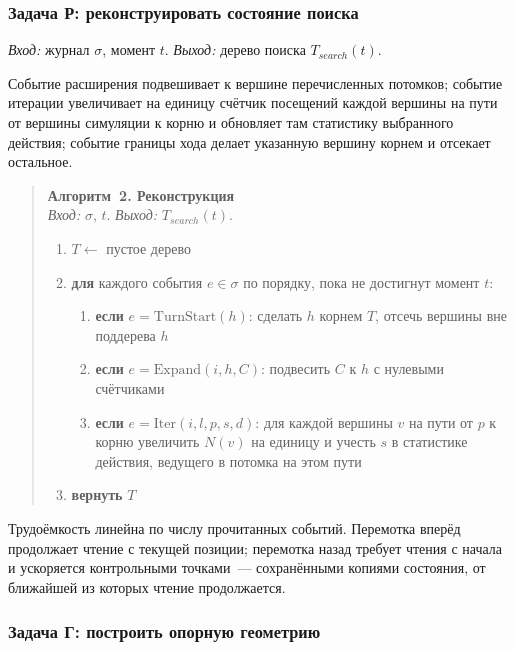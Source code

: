 \subsubsection{Задача Р: реконструировать состояние поиска}

\emph{Вход:} журнал $\sigma$, момент $t$.
\emph{Выход:} дерево поиска $T_{search}(t)$.

Событие расширения подвешивает к вершине перечисленных потомков; событие
итерации увеличивает на единицу счётчик посещений каждой вершины на пути от
вершины симуляции к корню и обновляет там статистику выбранного действия;
событие границы хода делает указанную вершину корнем и отсекает остальное.

\begin{quote}
\textbf{Алгоритм~2. Реконструкция}\\
\emph{Вход:} $\sigma$, $t$. \emph{Выход:} $T_{search}(t)$.
\begin{enumerate}
  \item $T \leftarrow$ пустое дерево
  \item \textbf{для} каждого события $e \in \sigma$ по порядку, пока не
        достигнут момент $t$:
  \begin{enumerate}
    \item \textbf{если} $e = \mathrm{TurnStart}(h)$: сделать $h$ корнем $T$,
          отсечь вершины вне поддерева $h$
    \item \textbf{если} $e = \mathrm{Expand}(i, h, C)$: подвесить $C$ к $h$
          с нулевыми счётчиками
    \item \textbf{если} $e = \mathrm{Iter}(i, l, p, s, d)$: для каждой
          вершины $v$ на пути от $p$ к корню увеличить $N(v)$ на единицу и
          учесть $s$ в статистике действия, ведущего в потомка на этом пути
  \end{enumerate}
  \item \textbf{вернуть} $T$
\end{enumerate}
\end{quote}

Трудоёмкость линейна по числу прочитанных событий. Перемотка вперёд
продолжает чтение с текущей позиции; перемотка назад требует чтения с
начала и ускоряется контрольными точками~--- сохранёнными копиями
состояния, от ближайшей из которых чтение продолжается.

\subsubsection{Задача Г: построить опорную геометрию}

